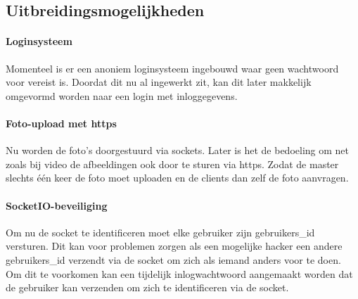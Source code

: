 \subsection{Uitbreidingsmogelijkheden}
\paragraph{Loginsysteem} Momenteel is er een anoniem loginsysteem ingebouwd waar geen wachtwoord voor vereist is. Doordat dit nu al ingewerkt zit, kan dit later makkelijk omgevormd worden naar een login met inloggegevens.
\paragraph{Foto-upload met https} Nu worden de foto's doorgestuurd via sockets. Later is het de bedoeling om net zoals bij video de afbeeldingen ook door te sturen via https. Zodat de master slechts één keer de foto moet uploaden en de clients dan zelf de foto aanvragen.
\paragraph{SocketIO-beveiliging} Om nu de socket te identificeren moet elke gebruiker zijn gebruikers\_id versturen. Dit kan voor problemen zorgen als een mogelijke hacker een andere gebruikers\_id verzendt via de socket om zich als iemand anders voor te doen. Om dit te voorkomen kan een tijdelijk inlogwachtwoord aangemaakt worden dat de gebruiker kan verzenden om zich te identificeren via de socket. 
 
 
 
 
 
